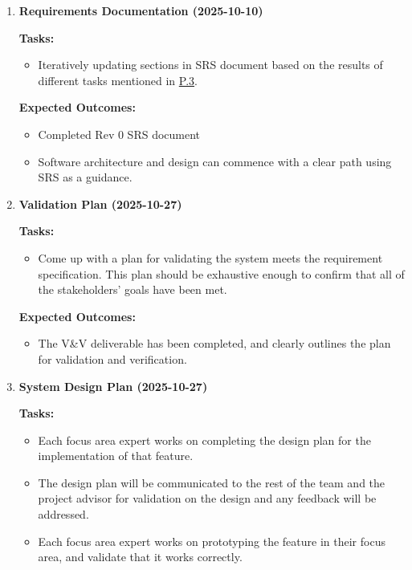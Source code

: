 \documentclass[12pt]{article}
\theoremstyle{definition}
\begin{document}
\begin{enumerate}
  \vspace{0.8em}

  \item \textbf{Requirements Documentation (2025-10-10)}  

  \textbf{Tasks:}
  \begin{itemize}
      \item Iteratively updating sections in SRS document based on the results
      of different tasks mentioned in \hyperref[item: p3]{P.3}. 
  \end{itemize}

  \textbf{Expected Outcomes:}
  \begin{itemize}
      \item Completed Rev 0 SRS document
      \item Software architecture and design can commence with a clear path
      using SRS as a guidance. 
  \end{itemize}

  \vspace{0.8em}

  \item \textbf{Validation Plan (2025-10-27)}  

  \textbf{Tasks:}
  \begin{itemize}
      \item Come up with a plan for validating the system meets the requirement
      specification. This plan should be exhaustive enough to confirm that all
      of the stakeholders' goals have been met. 
  \end{itemize}

  \textbf{Expected Outcomes:}
  \begin{itemize}
      \item The V\&V deliverable has been completed, and clearly outlines the
      plan for validation and verification. 
  \end{itemize}

  \vspace{0.8em}

  \item \textbf{System Design Plan (2025-10-27)}  

  \textbf{Tasks:}
  \begin{itemize}
      \item Each focus area expert works on completing the design plan for the
      implementation of that feature. 
      \item The design plan will be communicated to the rest of the team and the
       project advisor for validation on the design and any feedback will be
       addressed. 
      \item Each focus area expert works on prototyping the feature in their
      focus area, and validate that it works correctly. 
  \end{itemize}


\end{enumerate}
\end{document}
